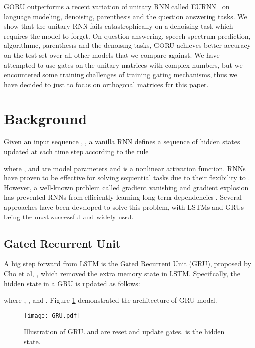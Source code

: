 \documentclass[letterpaper]{article} \usepackage{aaai18}  \usepackage{times}  \usepackage{helvet}  \usepackage{courier}  \usepackage{url}  \usepackage{graphicx}
\begin{document}
GORU outperforms a recent variation of unitary RNN called EURNN~\cite{jing2016tunable} on language modeling, denoising, parenthesis and the question answering tasks. We show that the unitary RNN fails catastrophically on a denoising task which requires the model to forget. On question answering, speech spectrum prediction, algorithmic, parenthesis and the denoising tasks, GORU achieves better accuracy on the test set over all other models that we compare against. We have attempted to use gates on the unitary matrices with complex numbers, but we encountered some training challenges of training gating mechanisms, thus we have decided to just to focus on orthogonal matrices for this paper.





\section{Background}


Given an input sequence , , a vanilla RNN defines a sequence of hidden states  updated at each time step according to the rule

where ,  and  are model parameters and  is a nonlinear activation function.
 RNNs have proven to be effective for solving sequential tasks due to their flexibility to . However, a well-known problem called gradient vanishing and gradient explosion has prevented RNNs from efficiently learning long-term dependencies \cite{bengio1994learning}. Several approaches have been developed to solve this problem, with LSTMs and GRUs being the most successful and widely used.

\subsection{Gated Recurrent Unit}



A big step forward from LSTM is the Gated Recurrent Unit (GRU), proposed by
Cho et al, \cite{cho2014properties}, which removed the extra memory state in LSTM. Specifically, the hidden state  in a GRU is updated as follows:

where , ,  and . Figure \ref{fig:gru} demonstrated the architecture of GRU model.

\begin{figure}[h!]
\centering
\texttt{[image: GRU.pdf]}
\caption{Illustration of GRU.  and  are reset and update gates.  is the hidden state.}
\label{fig:gru}
\end{figure} 
\end{document}
